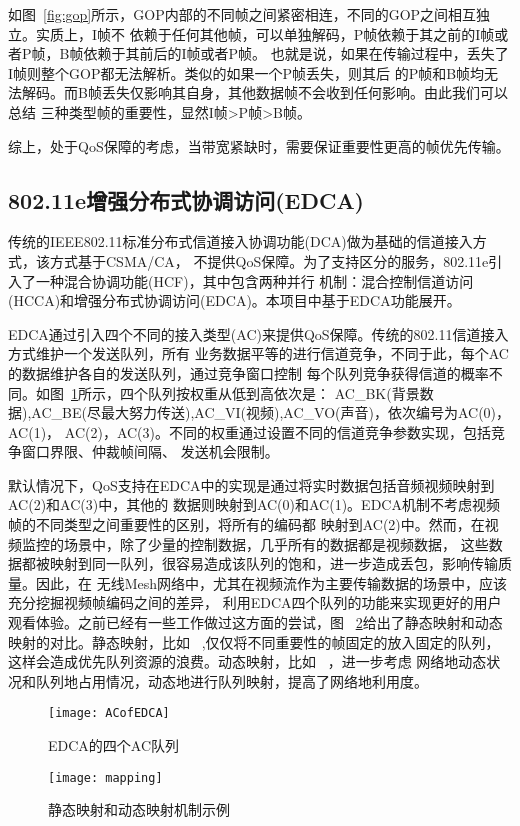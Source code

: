 如图~\ref{fig:gop}所示，GOP内部的不同帧之间紧密相连，不同的GOP之间相互独立。实质上，I帧不
依赖于任何其他帧，可以单独解码，P帧依赖于其之前的I帧或者P帧，B帧依赖于其前后的I帧或者P帧。
也就是说，如果在传输过程中，丢失了I帧则整个GOP都无法解析。类似的如果一个P帧丢失，则其后
的P帧和B帧均无法解码。而B帧丢失仅影响其自身，其他数据帧不会收到任何影响。由此我们可以总结
三种类型帧的重要性，显然I帧>P帧>B帧。

综上，处于QoS保障的考虑，当带宽紧缺时，需要保证重要性更高的帧优先传输。

\subsection{802.11e增强分布式协调访问(EDCA)}
传统的IEEE802.11标准分布式信道接入协调功能(DCA)做为基础的信道接入方式，该方式基于CSMA/CA，
不提供QoS保障。为了支持区分的服务，802.11e引入了一种混合协调功能(HCF)，其中包含两种并行
机制：混合控制信道访问(HCCA)和增强分布式协调访问(EDCA)。本项目中基于EDCA功能展开。

EDCA通过引入四个不同的接入类型(AC)来提供QoS保障。传统的802.11信道接入方式维护一个发送队列，所有
业务数据平等的进行信道竞争，不同于此，每个AC的数据维护各自的发送队列，通过竞争窗口控制
每个队列竞争获得信道的概率不同。如图~\ref{fig:acofedca}所示，四个队列按权重从低到高依次是：
AC\_BK(背景数据),AC\_BE(尽最大努力传送),AC\_VI(视频),AC\_VO(声音)，依次编号为AC(0)，AC(1)，
AC(2)，AC(3)。不同的权重通过设置不同的信道竞争参数实现，包括竞争窗口界限、仲裁帧间隔、
发送机会限制。

默认情况下，QoS支持在EDCA中的实现是通过将实时数据包括音频视频映射到AC(2)和AC(3)中，其他的
数据则映射到AC(0)和AC(1)。EDCA机制不考虑视频帧的不同类型之间重要性的区别，将所有的编码都
映射到AC(2)中。然而，在视频监控的场景中，除了少量的控制数据，几乎所有的数据都是视频数据，
这些数据都被映射到同一队列，很容易造成该队列的饱和，进一步造成丢包，影响传输质量。因此，在
无线Mesh网络中，尤其在视频流作为主要传输数据的场景中，应该充分挖掘视频帧编码之间的差异，
利用EDCA四个队列的功能来实现更好的用户观看体验。之前已经有一些工作做过这方面的尝试，图
~\ref{fig:originmapping}给出了静态映射和动态映射的对比。静态映射，比如~\cite{staticmapping}
,仅仅将不同重要性的帧固定的放入固定的队列，这样会造成优先队列资源的浪费。动态映射，比如
~\cite{dynamicmapping}，进一步考虑
网络地动态状况和队列地占用情况，动态地进行队列映射，提高了网络地利用度。

\begin{figure}[H] %
  \centering
  \texttt{[image: ACofEDCA]}
  \caption{EDCA的四个AC队列}
  \label{fig:acofedca}
\end{figure}
\begin{figure}[H] %
  \centering
  \texttt{[image: mapping]}
  \caption{静态映射和动态映射机制示例}
  \label{fig:originmapping}
\end{figure}

